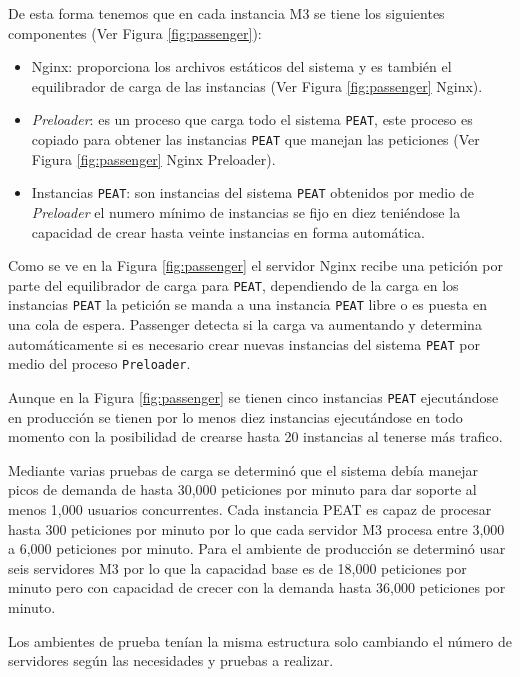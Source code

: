 De esta forma tenemos que en cada instancia M3 se tiene los
siguientes componentes (Ver Figura \ref{fig:passenger}):
\begin{itemize}
\item Nginx: proporciona los archivos estáticos del sistema y es también el
  equilibrador de carga de las instancias (Ver Figura \ref{fig:passenger} Nginx).
\item \textit{Preloader}: es un proceso que carga todo el sistema \texttt{PEAT},
  este proceso es copiado para obtener las instancias \texttt{PEAT} que manejan las
  peticiones (Ver Figura \ref{fig:passenger} Nginx Preloader).
\item Instancias \texttt{PEAT}: son instancias del sistema \texttt{PEAT} obtenidos
  por medio de \textit{Preloader} el numero mínimo de instancias se fijo en diez
  teniéndose la capacidad de crear hasta veinte instancias en forma automática.
\end{itemize}


Como se ve en la Figura \ref{fig:passenger} el servidor Nginx recibe una petición
por parte del equilibrador de carga para \texttt{PEAT}, dependiendo de la carga
en los instancias \texttt{PEAT} la petición se manda a una instancia \texttt{PEAT}
libre o es puesta en una cola de espera. Passenger detecta si la carga va aumentando
y determina automáticamente si es necesario crear nuevas instancias del sistema
\texttt{PEAT} por medio del proceso \texttt{Preloader}.

Aunque en la Figura \ref{fig:passenger} se tienen cinco instancias \texttt{PEAT}
ejecutándose en producción se tienen por lo menos diez instancias ejecutándose en
todo momento con la posibilidad de crearse hasta 20 instancias al tenerse más
trafico.

Mediante varias pruebas de carga se determinó que el sistema debía manejar picos
de demanda de hasta 30,000 peticiones por minuto para dar soporte al menos
1,000 usuarios concurrentes. Cada instancia PEAT es capaz de procesar hasta
300 peticiones por minuto por lo que cada servidor M3 procesa entre
3,000 a 6,000 peticiones por minuto. Para el ambiente de producción se determinó
usar seis servidores M3 por lo que la capacidad base es de 18,000
peticiones por minuto pero con capacidad de crecer con la demanda hasta
36,000 peticiones por minuto.

Los ambientes de prueba tenían la misma estructura solo cambiando el número
de servidores según las necesidades y pruebas a realizar.

